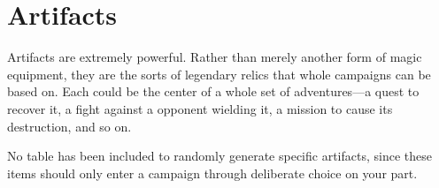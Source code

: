 \section{Artifacts}
Artifacts are extremely powerful. Rather than merely another form of magic equipment, they are the sorts of legendary relics that whole campaigns can be based on. Each could be the center of a whole set of adventures—a quest to recover it, a fight against a opponent wielding it, a mission to cause its destruction, and so on.

No table has been included to randomly generate specific artifacts, since these items should only enter a campaign through deliberate choice on your part.



